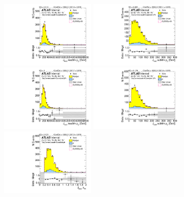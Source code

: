 \begin{figure}[htb!]
\begin{center}
\includegraphics[width=0.41\textwidth,angle=-90]{figures/boosted/Control/b77_ThreeTag_Control_leadHCand_trk0_Pt.pdf}
\includegraphics[width=0.41\textwidth,angle=-90]{figures/boosted/Control/b77_ThreeTag_Control_leadHCand_trk1_Pt.pdf}\\
\includegraphics[width=0.41\textwidth,angle=-90]{figures/boosted/Control/b77_ThreeTag_Control_sublHCand_trk0_Pt.pdf}
\includegraphics[width=0.41\textwidth,angle=-90]{figures/boosted/Control/b77_ThreeTag_Control_sublHCand_trk1_Pt.pdf}\\
\includegraphics[width=0.41\textwidth,angle=-90]{figures/boosted/Control/b77_ThreeTag_Control_leadHCand_trk_dr.pdf}

\end{center}
\end{figure}
